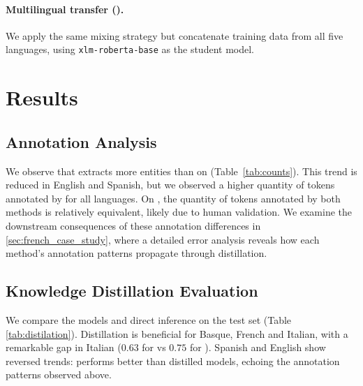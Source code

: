 \paragraph{Multilingual transfer (\Smulti).} We apply the same mixing strategy but concatenate training data from all five languages, using \verb|xlm-roberta-base| as the student model.

\section{Results}

\subsection{Annotation Analysis} 

We observe that \instruct extracts more entities than \dict on \Ssilver (Table~\ref{tab:counts}). This trend is reduced in English and Spanish, but we observed a higher quantity of \iclin tokens annotated by \instruct for all languages. On \Sval, the quantity of tokens annotated by both methods is relatively equivalent, likely due to human validation.
We examine the downstream consequences of these annotation differences in \autoref{sec:french_case_study}, where a detailed error analysis reveals how each method's annotation patterns propagate through distillation.

\begin{table}
    \centering
    \small
    \resizebox{1\textwidth}{!}{
        
    }
    \caption{Number of annotated tokens for each annotation type on \Ssilver and \Sval, comparing \dict and \instruct annotations.}
    \label{tab:counts}
\end{table}

\subsection{Knowledge Distillation Evaluation} 

We compare the \distilmodels models and direct \instruct inference on the \Sgold test set (Table \ref{tab:distilation}). Distillation is beneficial for Basque, French and Italian, with a remarkable gap in Italian ($0.63$ for \instruct vs $0.75$ for \distilmodels). Spanish and English show reversed trends: \instruct performs better than distilled models, echoing the annotation patterns observed above.

\begin{table}
    \centering
    \small
    
    \caption{Mean F1-score on \Sgold comparing direct \instruct output and \distilmodels models trained on \Ssilver, for each language.}
    \label{tab:distilation}
\end{table}

